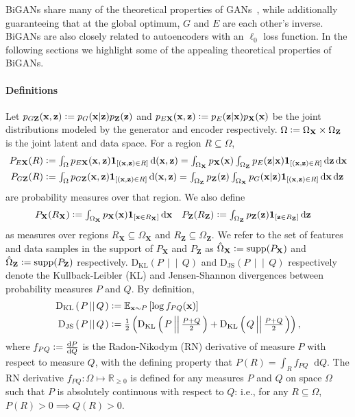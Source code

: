 \documentclass{article}
\newcommand{\expect}[2]{\mathbb{E}_{#1}\left[#2\right]}
\newcommand{\ldeltafunc}[1]{\mathbf{1}_{\left[#1\right]}}
\newcommand{\jsd}[2]{\mathrm{D_{JS}}\left(\left.#1\,\middle|\middle|\,#2\right.\right)}
\newcommand{\kld}[2]{\mathrm{D_{KL}}\left(\left.#1\,\middle|\middle|\,#2\right.\right)}
\newcommand{\defeq}{\vcentcolon=}
\renewcommand{\d}{\mathop{}\!\mathrm{d}}
\def\smallint{\begingroup\textstyle \int\endgroup}
\renewcommand{\vec}[1]{\mathbf{#1}}
\newcommand{\x}{\vec{x}}
\newcommand{\X}{\vec{X}}
\newcommand{\OX}{\Omega_\X}
\newcommand{\hOX}{\hat{\Omega}_\X}
\newcommand{\z}{\vec{z}}
\newcommand{\Z}{\vec{Z}}
\newcommand{\OZ}{\Omega_\Z}
\newcommand{\hOZ}{\hat{\Omega}_\Z}
\DeclareMathOperator*{\supp}{supp}
\begin{document}
BiGANs share many of the theoretical properties of GANs~\citep{gan}, while additionally guaranteeing that at the global optimum, $G$ and $E$ are each other's inverse.
BiGANs are also closely related to autoencoders with an $\ell_0$ loss function.
In the following sections we highlight some of the appealing theoretical properties of BiGANs.

\paragraph{Definitions}
\label{sec:defs}
Let $p_{G\Z}(\x, \z) \defeq p_G(\x | \z) p_\Z(\z)$ and $p_{E\X}(\x, \z) \defeq p_E(\z | \x) p_\X(\x)$
be the joint distributions modeled by the generator and encoder respectively.
$\Omega \defeq \OX \times \OZ$ is the joint latent and data space. For a region $R \subseteq \Omega$,
\begin{align*}
  P_{E\X}(R)
  &\defeq \smallint_{\Omega} p_{E\X}(\x, \z) \ldeltafunc{(\x, \z) \in R} \d(\x, \z)
  = \smallint_{\OX} p_\X(\x) \smallint_{\OZ} p_E(\z | \x) \ldeltafunc{(\x, \z) \in R} \d\z \d\x \\
  P_{G\Z}(R)
  &\defeq \smallint_{\Omega} p_{G\Z}(\x, \z) \ldeltafunc{(\x, \z) \in R} \d(\x, \z)
  = \smallint_{\OZ} p_\Z(\z) \smallint_{\OX} p_G(\x | \z) \ldeltafunc{(\x, \z) \in R} \d\x \d\z
\end{align*}
are probability measures over that region.
We also define
\begin{align*}
P_{\X}(R_\X)
&\defeq \smallint_{\OX} p_\X(\x) \ldeltafunc{\x \in R_\X} \d\x
&
P_{\Z}(R_\Z)
&\defeq \smallint_{\OZ} p_\Z(\z) \ldeltafunc{\z \in R_\Z} \d\z
\end{align*}
as measures over regions $R_\X \subseteq \OX$ and $R_\Z \subseteq \OZ$.
We refer to the set of features and data samples in the support of $P_\X$ and $P_\Z$ as
$ \hOX \defeq \supp(P_\X) $ and $ \hOZ \defeq \supp(P_\Z) $ respectively.
$\kld{P}{Q}$
and
$\jsd{P}{Q}$
respectively denote the
Kullback-Leibler (KL) and Jensen-Shannon divergences
between probability measures
$P$ and $Q$. By definition,
\begin{align*}
\kld{P}{Q}
&\defeq
\expect{\x \sim P}{\log f_{PQ}(\x)}
\\
\jsd{P}{Q}
&\defeq
\tfrac{1}{2}\left(
\kld{P}{\tfrac{P+Q}{2}}
+
\kld{Q}{\tfrac{P+Q}{2}}
\right),
\end{align*}
where $
f_{PQ} \defeq
\tfrac{\d P}{\d Q}
$ is the Radon-Nikodym (RN) derivative of measure $P$ with respect to measure $Q$, with the defining property that
$
P(R)
=
\int_R f_{PQ} \d Q
$.
The RN derivative $f_{PQ} : \Omega \mapsto \mathbb{R}_{\ge 0}$ is defined for any measures $P$ and $Q$ on space $\Omega$ such that $P$ is absolutely continuous with respect to $Q$: i.e., for any $R \subseteq \Omega$, $P(R)>0 \implies Q(R)>0$.
\end{document}

